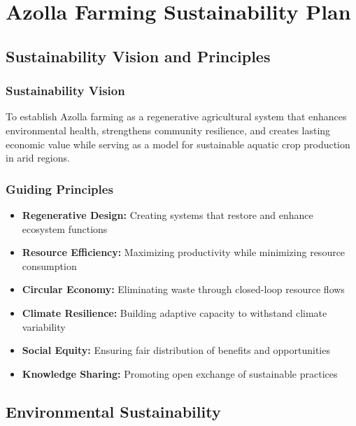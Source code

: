\section{Azolla Farming Sustainability Plan}

\subsection{Sustainability Vision and Principles}

\subsubsection{Sustainability Vision}
To establish Azolla farming as a regenerative agricultural system that enhances environmental health, strengthens community resilience, and creates lasting economic value while serving as a model for sustainable aquatic crop production in arid regions.

\subsubsection{Guiding Principles}
\begin{itemize}
    \item \textbf{Regenerative Design:} Creating systems that restore and enhance ecosystem functions
    \item \textbf{Resource Efficiency:} Maximizing productivity while minimizing resource consumption
    \item \textbf{Circular Economy:} Eliminating waste through closed-loop resource flows
    \item \textbf{Climate Resilience:} Building adaptive capacity to withstand climate variability
    \item \textbf{Social Equity:} Ensuring fair distribution of benefits and opportunities
    \item \textbf{Knowledge Sharing:} Promoting open exchange of sustainable practices
\end{itemize}

\subsection{Environmental Sustainability}

